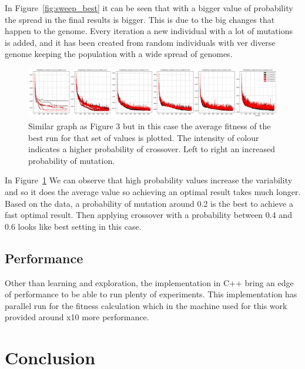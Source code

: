 \documentclass[12pt,oneside,a4paper]{article}
\begin{document}
    In Figure~\ref{fig:sweep_best} it can be seen that with a bigger value of probability the spread in the final
    results is bigger.
    This is due to the big changes that happen to the genome.
    Every iteration a new individual with a lot of mutations is added, and it has been created from random
    individuals with ver diverse genome keeping the population with a wide spread of genomes.

    \begin{figure}[h]
        \includegraphics[width=\textwidth]{sweep_values_get_avg_fitness}
        \caption{Similar graph as Figure 3 but in this case the average fitness of the best run for that set of
        values is plotted.
        The intensity of colour indicates a higher probability of crossover.
        Left to right an increased probability
        of mutation.}
        \label{fig:sweep_avg}
    \end{figure}

    In Figure~\ref{fig:sweep_avg} We can observe that high probability values increase the variability and so it does
    the average value so achieving an optimal result takes much longer.
    Based on the data, a probability of mutation around 0.2 is the best to achieve a fast optimal result.
    Then applying crossover with a probability between 0.4 and 0.6 looks like best setting in this case.





    \newpage

    \subsection{Performance}
    Other than learning and exploration, the implementation in C++ bring an edge of performance to be able to run
    plenty of experiments.
    This implementation has parallel run for the fitness calculation which in the machine used for this work provided
    around x10 more performance.


    \section{Conclusion}



    \newpage
    
    
\end{document}
